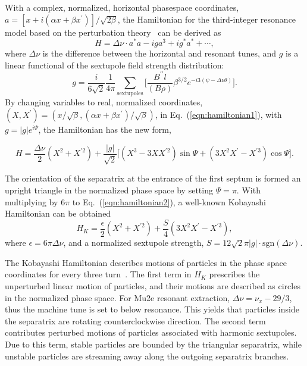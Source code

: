 \documentclass[aps,prstab,onecolumn,preprint]{revtex4-1}
\begin{document}
With a complex, normalized, horizontal phasespace coordinates, $a = [x + i (\alpha x + \beta x^{\prime})] / \sqrt{2 \beta}$, the Hamiltonian for the third-integer resonance model based on the perturbation theory~\cite{preliminary} can be derived as
\begin{equation}
  H = \Delta \nu \cdot a^{*} a - i g a^{3} + i g^{*} a^{*} + \cdots,
\label{eqn:hamiltonian1}
\end{equation}
where $\Delta \nu$ is the difference between the horizontal and resonant tunes, and $g$ is  a linear functional of the sextupole field strength distribution:
\begin{equation*}
  g = \frac{i}{6 \sqrt{2}} \frac{1}{4 \pi} \sum_{\text{sextupoles}}
      \Bigg[
        \frac{B^{\prime\prime} l}{(B\rho)} \beta^{3/2}
        e^{-i 3(\psi - \Delta \nu \theta)}
      \Bigg].
\end{equation*}
By changing variables to real, normalized coordinates, $(X, X^{\prime}) = (x/\sqrt{\beta}, (\alpha x + \beta x^{\prime}) / \sqrt{\beta})$, in Eq.~(\ref{eqn:hamiltonian1}), with $g = |g| e^{i \Psi}$, the Hamiltonian has the new form,
\begin{widetext}
\begin{equation}
  H = \frac{\Delta \nu}{2} \left( X^{2} + X^{\prime2} \right)
    + \frac{|g|}{\sqrt{2}}
      \Big[
        \left( X^{3} - 3 X X^{\prime 2} \right) \sin{\Psi}
      + \left( 3 X^{2} X^{\prime} - X^{\prime 3} \right) \cos{\Psi}
      \Big].
\label{eqn:hamiltonian2}
\end{equation}
\end{widetext}
The orientation of the separatrix at the entrance of the first septum is formed an upright triangle in the normalized phase space by setting $\Psi = \pi$. With multiplying by $6 \pi$ to Eq.~(\ref{eqn:hamiltonian2}), a well-known Kobayashi Hamiltonian can be obtained
\begin{equation}
  H_{K} = \frac{\epsilon}{2} \left( X^{2} + X^{\prime2} \right)
    + \frac{S}{4} \left( 3 X^{2} X^{\prime} - X^{\prime 3} \right),
\label{eqn:kobayashi}
\end{equation}
where $\epsilon = 6\pi \Delta \nu$, and a normalized sextupole strength, $S = 12\sqrt{2} \pi |g| \cdot \text{sgn}(\Delta \nu)$. 

The Kobayashi Hamiltonian describes motions of particles in the phase space coordinates for every three turn~\cite{kobayashi}.
The first term in $H_{K}$ prescribes the unperturbed linear motion of particles, and their motions are described as circles in the normalized phase space. For Mu2e resonant extraction, $\Delta \nu = \nu_{x} - 29/3$, thus the machine tune is set to below resonance. This yields that particles inside the separatrix are rotating counterclockwise direction. The second term contributes perturbed motions of particles associated with harmonic sextupoles. Due to this term, stable particles are bounded by the triangular separatrix, while unstable particles are streaming away along the outgoing separatrix branches. 
\end{document}
